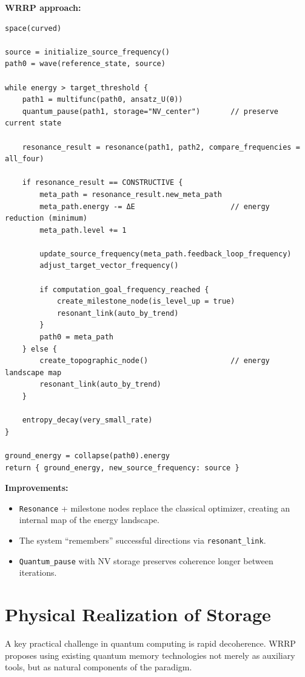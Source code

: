 \documentclass[11pt,a4paper]{article}
\begin{document}
\textbf{WRRP approach:}
\begin{verbatim}
space(curved)

source = initialize_source_frequency()
path0 = wave(reference_state, source)

while energy > target_threshold {
    path1 = multifunc(path0, ansatz_U(θ))
    quantum_pause(path1, storage="NV_center")       // preserve current state
    
    resonance_result = resonance(path1, path2, compare_frequencies = all_four)
    
    if resonance_result == CONSTRUCTIVE {
        meta_path = resonance_result.new_meta_path
        meta_path.energy -= ΔE                      // energy reduction (minimum)
        meta_path.level += 1
        
        update_source_frequency(meta_path.feedback_loop_frequency)
        adjust_target_vector_frequency()
        
        if computation_goal_frequency_reached {
            create_milestone_node(is_level_up = true)
            resonant_link(auto_by_trend)
        }
        path0 = meta_path
    } else {
        create_topographic_node()                   // energy landscape map
        resonant_link(auto_by_trend)
    }
    
    entropy_decay(very_small_rate)
}

ground_energy = collapse(path0).energy
return { ground_energy, new_source_frequency: source }
\end{verbatim}

\textbf{Improvements:}
\begin{itemize}[leftmargin=*]
    \item \texttt{Resonance} + milestone nodes replace the classical optimizer, creating an internal map of the energy landscape.
    \item The system ``remembers'' successful directions via \texttt{resonant\_link}.
    \item \texttt{Quantum\_pause} with NV storage preserves coherence longer between iterations.
\end{itemize}

\section{Physical Realization of Storage}

A key practical challenge in quantum computing is rapid decoherence. WRRP proposes using existing quantum memory technologies not merely as auxiliary tools, but as natural components of the paradigm.
\end{document}

